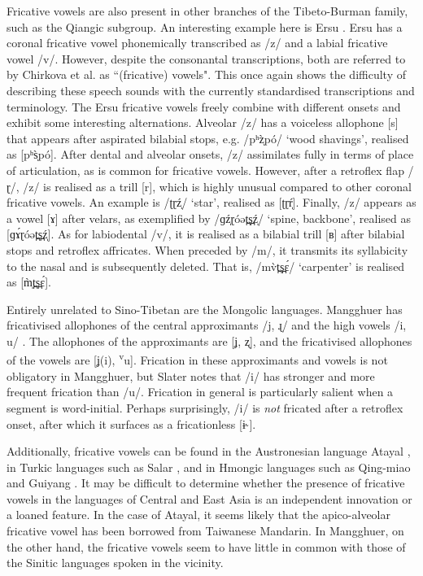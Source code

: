 \documentclass[output=paper,colorlinks,citecolor=brown,chinesefont]{langscibook}
\begin{document}
Fricative vowels are also present in other branches of the Tibeto-Burman family, such as the Qiangic subgroup. An interesting example here is Ersu \citep{Chirkova&al_2015}. Ersu has a coronal fricative vowel phonemically transcribed as /z/ and a labial fricative vowel /v/. However, despite the consonantal transcriptions, both are referred to by Chirkova et al. as ``(fricative) vowels". This once again shows the difficulty of describing these speech sounds with the currently standardised transcriptions and terminology. The Ersu fricative vowels freely combine with different onsets and exhibit some interesting alternations. Alveolar \mbox{/z/} has a voiceless allophone [s] that appears after aspirated bilabial stops, e.g. \mbox{/pʰz̩̀pó/} `wood shavings', realised as [pʰs̩̀pó]. After dental and alveolar onsets, \mbox{/z/} assimilates fully in terms of place of articulation, as is common for fricative vowels. However, after a retroflex flap /ɽ/, /z/ is realised as a trill [r], which is highly unusual compared to other coronal fricative vowels. An example is /ʈɽź̩/ `star', realised as [ʈɽŕ̩]. Finally, /z/ appears as a vowel [ɤ] after velars, as exemplified by /ɡź̩ɽóət̪s̪ź̩/ `spine, backbone', realised as [ɡɤ́ɽóət̪s̪ź̩]. As for labiodental /v/, it is realised as a bilabial trill [ʙ] after bilabial stops and retroflex affricates. When preceded by /m/, it transmits its syllabicity to the nasal and is subsequently deleted. That is, /mv̀t̪s̪ɛ́/ `carpenter' is realised as [m̩̀t̪s̪ɛ́].

Entirely unrelated to Sino-Tibetan are the Mongolic languages. Mangghuer has fricativised allophones of the central approximants /j, ɻ/ and the high vowels /i, u/ \citep{Slater_2003}. The allophones of the approximants are [ʝ, ʐ], and the fricativised allophones of the vowels are [ʝ(i), \textsuperscript{v}u]. Frication in these approximants and vowels is not obligatory in Mangghuer, but Slater notes that /i/ has stronger and more frequent frication than /u/. Frication in general is particularly salient when a segment is word-initial. Perhaps surprisingly, /i/ is \textit{not} fricated after a retroflex onset, after which it surfaces as a fricationless [ɨ˞].

Additionally, fricative vowels can be found in the Austronesian language Ata\-yal \citep{Huang_2018}, in Turkic languages such as Salar \citep{Johanson&Csató_1998}, and in Hmongic languages such as Qing-miao \citep{Gao_1982} and Guiyang \citep[130]{Niederer_1998}. It may be difficult to determine whether the presence of fricative vowels in the languages of Central and East Asia is an independent innovation or a loaned feature. In the case of Atayal, it seems likely that the apico-alveolar fricative vowel has been borrowed from Taiwanese Mandarin. In Mangghuer, on the other hand, the fricative vowels seem to have little in common with those of the Sinitic languages spoken in the vicinity.
\end{document}
